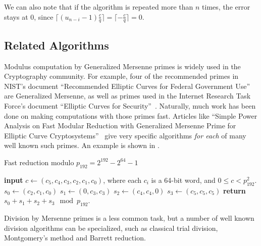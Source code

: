 We can also note that if the algorithm is repeated more than $n$ times, the error stays at 0, since 
$\lceil (u_{n-i}-1)\frac{c}{q}\rceil = \lceil -\frac{c}{q}\rceil = 0$.


\subsection{Related Algorithms}

Modulus computation by Generalized Mersenne primes is widely used in the Cryptography community.
For example, four of the recommended primes in NIST's document ``Recommended Elliptic Curves for Federal Government Use''~\cite{nist} are Generalized Mersenne,
as well as primes used in the Internet Research Task Force's document ``Elliptic Curves for Security''~\cite{rfc7748}.
Naturally, much work has been done on making computations with those primes fast.
Articles like ``Simple Power Analysis on Fast Modular Reduction with Generalized Mersenne Prime for Elliptic Curve Cryptosystems''~\cite{sakai2006simple}
give very specific algorithms \emph{for each} of many well known such primes.
An example is shown in .

\begin{algorithm}[H]
	\caption{Fast reduction modulo $p_{192} = 2^{192} - 2^{64} - 1$}
	\label{alg:solina}
	\begin{algorithmic}
		\State \textbf{input} $c \gets (c_5, c_4, c_3, c_2, c_1, c_0)$, where each $c_i$ is a 64-bit word, and $0 \le c < p^2_{192}$.
		\State $s_0 \gets (c_2, c_1, c_0)$
		\State $s_1 \gets (0, c_3, c_3)$
		\State $s_2 \gets (c_4, c_4, 0)$
		\State $s_3 \gets (c_5, c_5, c_5)$
		\State \textbf{return} $s_0 + s_1 + s_2 + s_3 \mod p_{192}$.
	\end{algorithmic}
\end{algorithm}

Division by Mersenne primes is a less common task, but a number of well known division algorithms can be specialized, such as
classical trial division, Montgomery's method and Barrett reduction.




